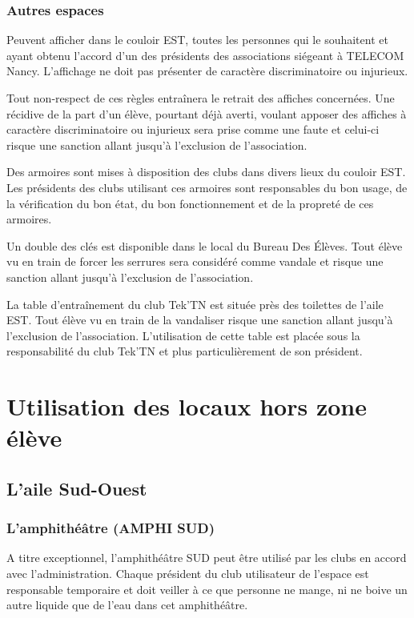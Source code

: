 \documentclass{article} %
\begin{document}
			\subsubsection{Autres espaces}

				Peuvent afficher dans le couloir EST, toutes les personnes qui
				le souhaitent et ayant obtenu l’accord d’un des présidents des
				associations siégeant à TELECOM Nancy. L’affichage ne doit pas
				présenter de caractère discriminatoire ou injurieux.

				Tout non-respect de ces règles entraînera le retrait des
				affiches concernées. Une récidive de la part d’un élève,
				pourtant déjà averti, voulant apposer des affiches à caractère
				discriminatoire ou injurieux sera prise comme une faute et
				celui-ci risque une sanction allant jusqu’à l’exclusion de
				l’association.

				Des armoires sont mises à disposition des clubs dans divers
				lieux du couloir EST. Les présidents des clubs utilisant ces
				armoires sont responsables du bon usage, de la vérification du
				bon état, du bon fonctionnement et de la propreté de ces
				armoires. 

				Un double des clés est disponible dans le local du Bureau Des
				Élèves. Tout élève vu en train de forcer les serrures sera
				considéré comme vandale et risque une sanction allant jusqu’à
				l’exclusion de l’association.

				La table d'entraînement du club Tek’TN est située près des
				toilettes de l’aile EST. Tout élève vu en train de la
				vandaliser risque une sanction allant jusqu’à l’exclusion de
				l’association. L’utilisation de cette table est placée sous la
				responsabilité du club Tek’TN et plus particulièrement de son
				président.

	\section{Utilisation des locaux hors zone élève}

		\subsection{L’aile Sud-Ouest}

			\subsubsection{L’amphithéâtre (AMPHI SUD)}

				A titre exceptionnel, l’amphithéâtre SUD peut être utilisé par
				les clubs en accord avec l’administration. Chaque président du
				club utilisateur de l’espace est responsable temporaire et doit
				veiller à ce que personne ne mange, ni ne boive un autre
				liquide que de l’eau dans cet amphithéâtre.
\end{document}
